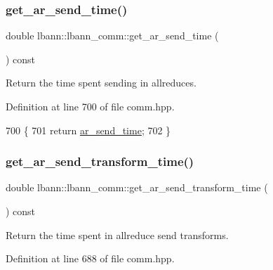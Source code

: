 \subsubsection{\texorpdfstring{get\+\_\+ar\+\_\+send\+\_\+time()}{get\_ar\_send\_time()}}
{\footnotesize\ttfamily double lbann\+::lbann\+\_\+comm\+::get\+\_\+ar\+\_\+send\+\_\+time (\begin{DoxyParamCaption}{ }\end{DoxyParamCaption}) const\hspace{0.3cm}{\ttfamily [inline]}}

Return the time spent sending in allreduces. 

Definition at line 700 of file comm.\+hpp.


\begin{DoxyCode}
700                                          \{
701     \textcolor{keywordflow}{return} \hyperlink{classlbann_1_1lbann__comm_a60a664f47efb52d9936b72d34059d1ef}{ar\_send\_time};
702   \}
\end{DoxyCode}
\mbox{\label{classlbann_1_1lbann__comm_aed5d56c2b7205009c67ab37ea1c1556f}} 
\subsubsection{\texorpdfstring{get\+\_\+ar\+\_\+send\+\_\+transform\+\_\+time()}{get\_ar\_send\_transform\_time()}}
{\footnotesize\ttfamily double lbann\+::lbann\+\_\+comm\+::get\+\_\+ar\+\_\+send\+\_\+transform\+\_\+time (\begin{DoxyParamCaption}{ }\end{DoxyParamCaption}) const\hspace{0.3cm}{\ttfamily [inline]}}

Return the time spent in allreduce send transforms. 

Definition at line 688 of file comm.\+hpp.


